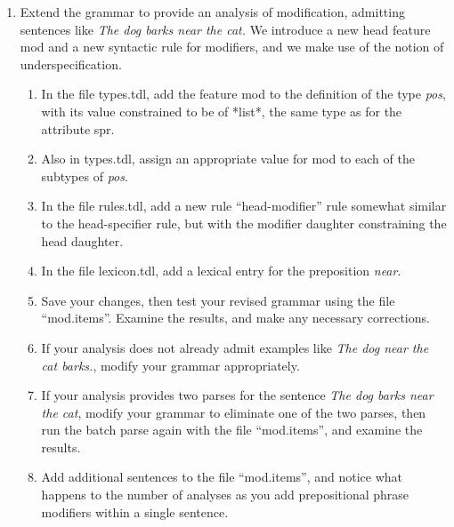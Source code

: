 \documentclass[10pt]{article}
\begin{document}
\begin{enumerate}
\item Extend the grammar to provide an analysis of modification, admitting
sentences like {\it The dog barks near the cat.}  We introduce a new head 
feature {\sc mod} and a new syntactic rule for modifiers, and we make use 
of the notion of underspecification.
\begin{enumerate}
\item In the file types.tdl, add the feature {\sc mod} to the definition of
the type {\it pos}, with its value constrained to be of *list*, the same
type as for the attribute {\sc spr}.
\item Also in types.tdl, assign an appropriate value for {\sc mod} to each
of the subtypes of {\it pos}.
\item In the file rules.tdl, add a new rule ``head-modifier'' rule somewhat
similar to the head-specifier rule, but with the modifier daughter constraining
the head daughter.
\item In the file lexicon.tdl, add a lexical entry for the preposition 
{\it near}.
\item Save your changes, then test your revised grammar using the file ``mod.items''.  Examine the results, and make any necessary corrections.
\item If your analysis does not already admit examples like {\it The dog near 
the cat barks.}, modify your grammar appropriately.
\item If your analysis provides two parses for the sentence {\it The dog barks near the cat}, modify your grammar to eliminate one of the two parses, then run
the batch parse again with the file ``mod.items'', and examine the results.
\item Add additional sentences to the file ``mod.items'', and notice what 
happens to the number of analyses as you add prepositional phrase modifiers 
within a single sentence.
 \end{enumerate}

 \end{enumerate}
\end{document}

